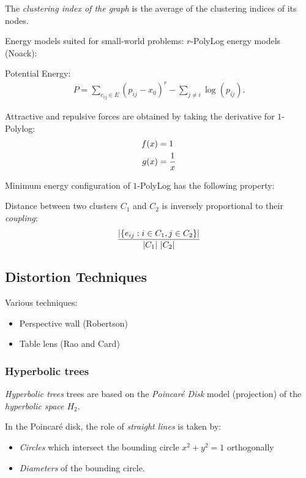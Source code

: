 The \emph{clustering index of the graph} is the average of the clustering indices of its nodes.


Energy models suited for small-world problems:
$r$-PolyLog energy models (Noack):

\begin{description}
\item Potential Energy:
    \begin{align*}
        P = \sum_{e_{ij} \in E} (p_{ij} -x_0)^r - \sum_{j\neq i} \log (p_{ij}).
    \end{align*}
\item Attractive and repulsive forces are obtained by taking the derivative for $1$-Polylog:
\begin{align*}
 f(x) &= 1 \\
 g(x) &= {1\over x}
\end{align*}
\item Minimum energy configuration of $1$-PolyLog has the following property:
    
    Distance between two clusters $C_1$ and $C_2$ is inversely proportional to their \emph{coupling}:
    \begin{align*}
        {\left| 
            \left\{
                e_{ij}: i\in C_1, j\in C_2
            \right\}
         \right| \over
             |C_1|\ |C_2|
         }
    \end{align*}

\end{description}

\subsection{Distortion Techniques}

Various techniques:
\begin{itemize}
\item Perspective wall (Robertson)
\item Table lens (Rao and Card)
\end{itemize}

\subsubsection{Hyperbolic trees}
\emph{Hyperbolic trees} trees are based on the \emph{Poincaré Disk} model (projection) of the \emph{hyperbolic space $H_2$}.

In the Poincaré disk, the role of \emph{straight lines} is taken by:
\begin{itemize}
\item \emph{Circles} which intersect the bounding circle $x^2+y^2=1$ orthogonally
\item \emph{Diameters} of the bounding circle.
\end{itemize}

